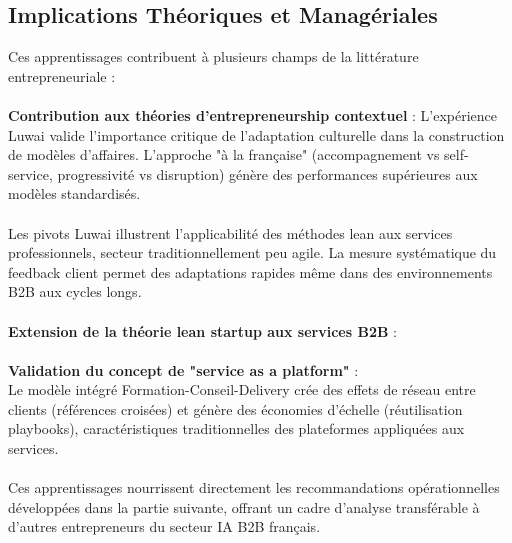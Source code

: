 \subsection{Implications Théoriques et Managériales}

Ces apprentissages contribuent à plusieurs champs de la littérature entrepreneuriale :
\\\\
\textbf{Contribution aux théories d'entrepreneurship contextuel} \cite{welter2011contextualizing} :
L'expérience Luwai valide l'importance critique de l'adaptation culturelle dans la construction de modèles d'affaires. L'approche "à la française" (accompagnement vs self-service, progressivité vs disruption) génère des performances supérieures aux modèles standardisés.
\\\\
Les pivots Luwai illustrent l'applicabilité des méthodes lean aux services professionnels, secteur traditionnellement peu agile. La mesure systématique du feedback client permet des adaptations rapides même dans des environnements B2B aux cycles longs.
\\\\
\textbf{Extension de la théorie lean startup aux services B2B} \cite{ries2011lean} :
\\\\
\textbf{Validation du concept de "service as a platform"} \cite{parker2016platform} :\\
Le modèle intégré Formation-Conseil-Delivery crée des effets de réseau entre clients (références croisées) et génère des économies d'échelle (réutilisation playbooks), caractéristiques traditionnelles des plateformes appliquées aux services.
\\\\
Ces apprentissages nourrissent directement les recommandations opérationnelles développées dans la partie suivante, offrant un cadre d'analyse transférable à d'autres entrepreneurs du secteur IA B2B français.
